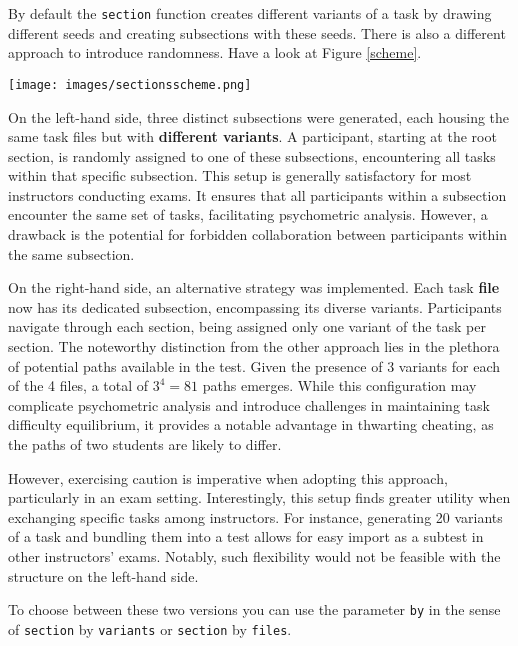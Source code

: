 \documentclass[twoside]{tufte-book}
\begin{document}
By default the \texttt{section} function creates different variants of a task by drawing different seeds and creating subsections with these seeds. There is also a different approach to introduce randomness. Have a look at Figure \ref{scheme}.

\begin{figure*}
\centering
\texttt{[image: images/sectionsscheme.png]}
\caption{\label{scheme}Two approaches for structuring parallel versions of tasks}
\end{figure*}

On the left-hand side, three distinct subsections were generated, each housing the same task files but with \textbf{different variants}. A participant, starting at the root section, is randomly assigned to one of these subsections, encountering all tasks within that specific subsection. This setup is generally satisfactory for most instructors conducting exams. It ensures that all participants within a subsection encounter the same set of tasks, facilitating psychometric analysis. However, a drawback is the potential for forbidden collaboration between participants within the same subsection.

On the right-hand side, an alternative strategy was implemented. Each task \textbf{file} now has its dedicated subsection, encompassing its diverse variants. Participants navigate through each section, being assigned only one variant of the task per section. The noteworthy distinction from the other approach lies in the plethora of potential paths available in the test. Given the presence of 3 variants for each of the 4 files, a total of \(3^4 = 81\) paths emerges. While this configuration may complicate psychometric analysis and introduce challenges in maintaining task difficulty equilibrium, it provides a notable advantage in thwarting cheating, as the paths of two students are likely to differ.

However, exercising caution is imperative when adopting this approach, particularly in an exam setting. Interestingly, this setup finds greater utility when exchanging specific tasks among instructors. For instance, generating 20 variants of a task and bundling them into a test allows for easy import as a subtest in other instructors' exams. Notably, such flexibility would not be feasible with the structure on the left-hand side.

To choose between these two versions you can use the parameter \texttt{by} in the sense of \texttt{section} by \texttt{variants} or \texttt{section} by \texttt{files}.
\end{document}
